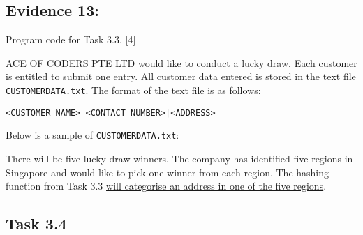 \subsection*{Evidence 13: }

Program code for Task 3.3.\hfill{} {[}4{]}

ACE OF CODERS PTE LTD would like to conduct a lucky draw. Each customer
is entitled to submit one entry. All customer data entered is stored
in the text file \texttt{CUSTOMERDATA.txt}. The format of the text
file is as follows: 
\noindent \begin{center}
\texttt{<CUSTOMER NAME> <CONTACT NUMBER>|<ADDRESS> }
\par\end{center}

Below is a sample of \texttt{CUSTOMERDATA.txt}: 

\noindent{}

There will be five lucky draw winners. The company has identified
five regions in Singapore and would like to pick one winner from each
region. The hashing function from Task 3.3 \uline{will categorise
an address in one of the five regions}. 

\subsection*{Task 3.4 }

